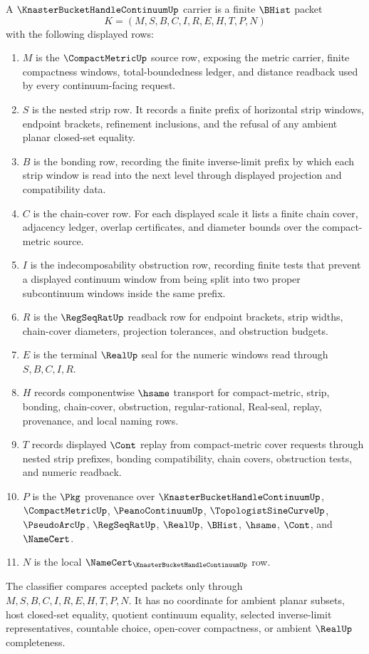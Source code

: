\begin{definition}
\label{def:knaster-bucket-handle-continuum-carrier}
A $\KnasterBucketHandleContinuumUp$ carrier is a finite $\BHist$ packet
$$
K=(M,S,B,C,I,R,E,H,T,P,N)
$$
with the following displayed rows:
\begin{enumerate}
\item $M$ is the $\CompactMetricUp$ source row, exposing the metric carrier, finite compactness windows, total-boundedness ledger, and distance readback used by every continuum-facing request.
\item $S$ is the nested strip row. It records a finite prefix of horizontal strip windows, endpoint brackets, refinement inclusions, and the refusal of any ambient planar closed-set equality.
\item $B$ is the bonding row, recording the finite inverse-limit prefix by which each strip window is read into the next level through displayed projection and compatibility data.
\item $C$ is the chain-cover row. For each displayed scale it lists a finite chain cover, adjacency ledger, overlap certificates, and diameter bounds over the compact-metric source.
\item $I$ is the indecomposability obstruction row, recording finite tests that prevent a displayed continuum window from being split into two proper subcontinuum windows inside the same prefix.
\item $R$ is the $\RegSeqRatUp$ readback row for endpoint brackets, strip widths, chain-cover diameters, projection tolerances, and obstruction budgets.
\item $E$ is the terminal $\RealUp$ seal for the numeric windows read through $S,B,C,I,R$.
\item $H$ records componentwise $\hsame$ transport for compact-metric, strip, bonding, chain-cover, obstruction, regular-rational, Real-seal, replay, provenance, and local naming rows.
\item $T$ records displayed $\Cont$ replay from compact-metric cover requests through nested strip prefixes, bonding compatibility, chain covers, obstruction tests, and numeric readback.
\item $P$ is the $\Pkg$ provenance over $\KnasterBucketHandleContinuumUp$, $\CompactMetricUp$, $\PeanoContinuumUp$, $\TopologistSineCurveUp$, $\PseudoArcUp$, $\RegSeqRatUp$, $\RealUp$, $\BHist$, $\hsame$, $\Cont$, and $\NameCert$.
\item $N$ is the local $\NameCert_{\KnasterBucketHandleContinuumUp}$ row.
\end{enumerate}
The classifier compares accepted packets only through $M,S,B,C,I,R,E,H,T,P,N$. It has no coordinate for ambient planar subsets, host closed-set equality, quotient continuum equality, selected inverse-limit representatives, countable choice, open-cover compactness, or ambient $\RealUp$ completeness.
\end{definition}


